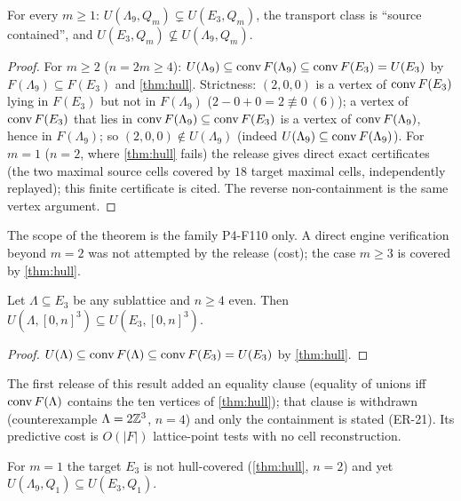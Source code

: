 \begin{theorem}\label{thm:P4T2}
For every $m\ge1$: $U(\Lambda_9,Q_m)\subsetneq U(E_3,Q_m)$, the transport class is ``source contained'', and $U(E_3,Q_m)\not\subseteq U(\Lambda_9,Q_m)$.
\end{theorem}
\begin{proof}
For $m\ge2$ ($n=2m\ge4$): $U(\Lambda_9)\subseteq\operatorname{conv} F(\Lambda_9)\subseteq\operatorname{conv} F(E_3)=U(E_3)$ by $F(\Lambda_9)\subseteq F(E_3)$ and \cref{thm:hull}. Strictness: $(2,0,0)$ is a vertex of $\operatorname{conv} F(E_3)$ lying in $F(E_3)$ but not in $F(\Lambda_9)$ ($2-0+0=2\not\equiv0\ (6)$); a vertex of $\operatorname{conv} F(E_3)$ that lies in $\operatorname{conv} F(\Lambda_9)\subseteq\operatorname{conv} F(E_3)$ is a vertex of $\operatorname{conv} F(\Lambda_9)$, hence in $F(\Lambda_9)$; so $(2,0,0)\notin U(\Lambda_9)$ (indeed $U(\Lambda_9)\subseteq\operatorname{conv} F(\Lambda_9)$). For $m=1$ ($n=2$, where \cref{thm:hull} fails) the release gives direct exact certificates (the two maximal source cells covered by $18$ target maximal cells, independently replayed); this finite certificate is cited. The reverse non-containment is the same vertex argument. \qedhere
\end{proof}
The scope of the theorem is the family P4-F110 only. A direct engine verification beyond $m=2$ was not attempted by the release (cost); the case $m\ge3$ is covered by \cref{thm:hull}.
\begin{corollary}\label{cor:P4C1}
Let $\Lambda\subseteq E_3$ be any sublattice and $n\ge4$ even. Then $U(\Lambda,[0,n]^3)\subseteq U(E_3,[0,n]^3)$.
\end{corollary}
\begin{proof}
$U(\Lambda)\subseteq\operatorname{conv} F(\Lambda)\subseteq\operatorname{conv} F(E_3)=U(E_3)$ by \cref{thm:hull}. \qedhere
\end{proof}
The first release of this result added an equality clause (equality of unions iff $\operatorname{conv} F(\Lambda)$ contains the ten vertices of \cref{thm:hull}); that clause is withdrawn (counterexample $\Lambda=2\mathbb Z^3$, $n=4$) and only the containment is stated (ER-21).
 Its predictive cost is $O(|F|)$ lattice-point tests with no cell reconstruction.
\begin{proposition}\label{prop:holes}
For $m=1$ the target $E_3$ is not hull-covered (\cref{thm:hull}, $n=2$) and yet $U(\Lambda_9,Q_1)\subseteq U(E_3,Q_1)$.
\end{proposition}
